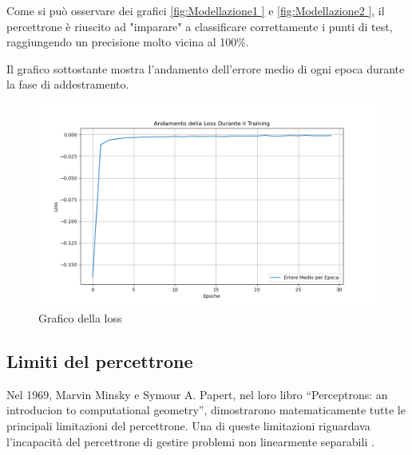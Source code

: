 Come si può osservare dei grafici \ref{fig:Modellazione1 } e \ref{fig:Modellazione2 }, 
il percettrone è riuscito ad "imparare" 
a classificare correttamente i punti di test, raggiungendo un precisione molto vicina al 100\%.

Il grafico sottostante mostra l'andamento dell'errore medio di ogni epoca 
durante la fase di addestramento.

\begin{figure}[H]
    \centering
    \includegraphics[width=1\textwidth]{Immagini/Grafici/EsempioApplicativoPercettroneLOSS.png}
    \caption{Grafico della loss}
    \label{fig:Modellazione3 }
\end{figure}







\subsection{Limiti del percettrone}
Nel 1969, Marvin Minsky e Symour A. Papert, nel loro libro “Perceptrons: an 
introducion to computational geometry”, dimostrarono matematicamente tutte le 
principali limitazioni 
del percettrone. 
Una di queste limitazioni riguardava l'incapacità del percettrone di gestire 
problemi non linearmente separabili \cite{ARTICOLO_LIMITI_PRECETTRONE}.

